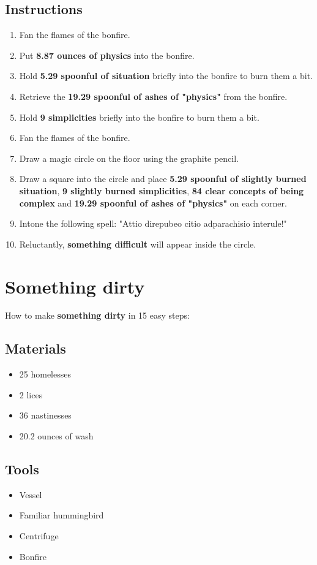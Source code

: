 \documentclass{article}
\begin{document}
\subsection{Instructions}\begin{enumerate}
\item 
Fan the flames of the bonfire.
\item 
Put \textbf{8.87 ounces of physics} into the bonfire.
\item 
Hold \textbf{5.29 spoonful of situation} briefly into the bonfire to burn them a bit.
\item 
Retrieve the \textbf{19.29 spoonful of ashes of "physics"} from the bonfire.
\item 
Hold \textbf{9 simplicities} briefly into the bonfire to burn them a bit.
\item 
Fan the flames of the bonfire.
\item 
Draw a magic circle on the floor using the graphite pencil.
\item 
Draw a square into the circle and place \textbf{5.29 spoonful of slightly burned situation}, \textbf{9 slightly burned simplicities}, \textbf{84 clear concepts of being complex} and \textbf{19.29 spoonful of ashes of "physics"} on each corner.
\item 
Intone the following spell: "Attio direpubeo citio adparachisio interule!"
\item 
Reluctantly, \textbf{something difficult} will appear inside the circle.
\end{enumerate}
\newpage
\section{Something dirty}How to make \textbf{something dirty} in 15 easy steps:

\subsection{Materials}\begin{itemize}
\item 
25 homelesses
\item 
2 lices
\item 
36 nastinesses
\item 
20.2 ounces of wash
\end{itemize}
\subsection{Tools}\begin{itemize}
\item 
Vessel
\item 
Familiar hummingbird
\item 
Centrifuge
\item 
Bonfire
\end{itemize}
\end{document}
